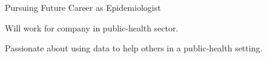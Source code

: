 \begin{cventries}
\cventry
    {Pursuing Future Career as Epidemiologist}
    {}
    {}
    {}
    {
      \begin{cvitems}
        \item {Will work for company in public-health sector.}
        \item {Passionate about using data to help others in a public-health setting.}
        \end{cvitems}
}
\end{cventries}
